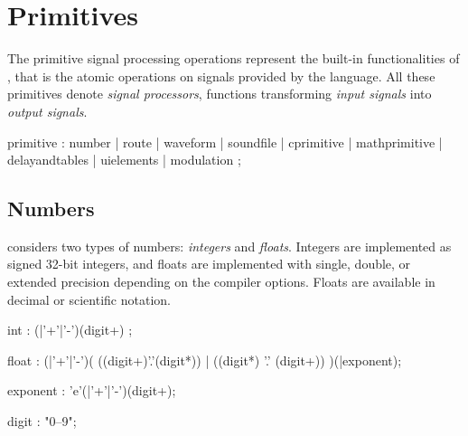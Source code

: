 \section{Primitives}
\label{primitives}
The primitive signal processing operations represent the built-in functionalities of \faust, that is the atomic operations on signals provided by the language. All these primitives denote \emph{signal processors}, functions transforming \emph{input signals} into \emph{output signals}.

\begin{rail}
	primitive : number
	| route
	| waveform
	| soundfile
	| cprimitive
	| mathprimitive
	| delayandtables
	| uielements
	| modulation
	;
\end{rail}

\subsection{Numbers}

\faust considers two types of numbers: \textit{integers} and \textit{floats}. Integers are implemented as signed 32-bit integers, and floats are implemented with single, double, or extended precision depending on the compiler options. Floats are available in decimal or scientific notation.

\begin{rail}
	int : (|'+'|'-')(digit+) ;
\end{rail}

\begin{rail}
	float : (|'+'|'-')( ((digit+)'.'(digit*)) | ((digit*) '.' (digit+)) )(|exponent);
\end{rail}

\begin{rail}
	exponent : 'e'(|'+'|'-')(digit+);
\end{rail}

\begin{rail}
	digit : "0--9";
\end{rail}

\bigskip

